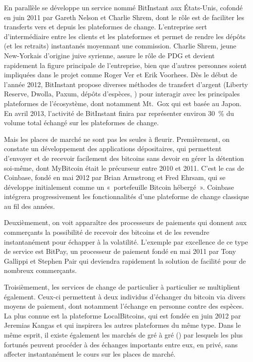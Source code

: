 En parallèle se développe un service nommé BitInstant aux États-Unis, cofondé en juin 2011 par Gareth Nelson et Charlie Shrem, dont le rôle est de faciliter les transferts vers et depuis les plateformes de change. L'entreprise sert d'intermédiaire entre les clients et les plateformes et permet de rendre les dépôts (et les retraits) instantanés moyennant une commission. Charlie Shrem, jeune New-Yorkais d'origine juive syrienne, assure le rôle de PDG et devient rapidement la figure principale de l'entreprise, bien que d'autres personnes soient impliquées dans le projet comme Roger Ver et Erik Voorhees. Dès le début de l'année 2012, BitInstant propose diverses méthodes de transfert d'argent (Liberty Reserve, Dwolla, Paxum, dépôts d'espèces, ) pour interagir avec les principales plateformes de l'écosystème, dont notamment Mt.~Gox qui est basée au Japon. En avril 2013, l'activité de BitInstant finira par représenter environ 30~\% du volume total échangé sur les plateformes de change.

Mais les places de marché ne sont pas les seules à fleurir. Premièrement, on constate un développement des applications dépositaires, qui permettent d'envoyer et de recevoir facilement des bitcoins sans devoir en gérer la détention soi-même, dont MyBitcoin était le précurseur entre 2010 et 2011. C'est le cas de Coinbase, fondé en mai 2012 par Brian Armstrong et Fred Ehrsam, qui se développe initialement comme un «~portefeuille Bitcoin hébergé~». Coinbase intégrera progressivement les fonctionnalités d'une plateforme de change classique au fil des années.

Deuxièmement, on voit apparaître des processeurs de paiements qui donnent aux commerçants la possibilité de recevoir des bitcoins et de les revendre instantanément pour échapper à la volatilité. L'exemple par excellence de ce type de service est BitPay, un processeur de paiement fondé en mai 2011 par Tony Gallippi et Stephen Pair qui deviendra rapidement la solution de facilité pour de nombreux commerçants.

Troisièmement, les services de change de particulier à particulier se multiplient également. Ceux-ci permettent à deux individus d'échanger du bitcoin via divers moyens de paiement, dont notamment l'échange en personne contre des espèces. La plus connue est la plateforme LocalBitcoins, qui est fondée en juin 2012 par Jeremias Kangas et qui inspirera les autres plateformes du même type. Dans le même esprit, il existe également les marchés de gré à gré () par lesquels les plus fortunés peuvent procéder à des échanges importants entre eux, en privé, sans affecter instantanément le cours sur les places de marché.

